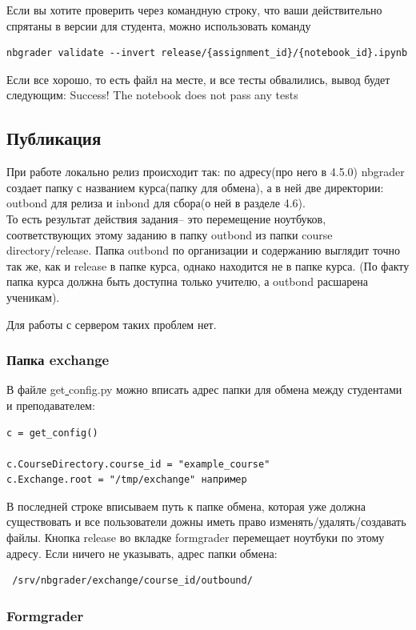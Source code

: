\documentclass[a4paper,12pt]{article}
\begin{document}
Если вы хотите проверить через командную строку, что ваши действительно спрятаны в версии для студента, можно использовать команду
\begin{verbatim}
nbgrader validate --invert release/{assignment_id}/{notebook_id}.ipynb
\end{verbatim}
Если все хорошо, то есть файл на месте, и все тесты обвалились, вывод будет следующим:
\grqq Success! The notebook does not pass any tests\grqq
\subsection{Публикация}

При работе локально релиз происходит так: по адресу(про него в 4.5.0) nbgrader создает папку с названием курса(папку для обмена), а в ней две директории: outbond для релиза и inbond для сбора(о ней в разделе 4.6). \\То есть результат действия  задания\grqq -- это перемещение ноутбуков, соответствующих этому заданию в папку outbond из папки course\underline{ }directory/release.
Папка outbond по организации и содержанию выглядит точно так же, как и release в папке курса, однако находится не в папке курса. (По факту папка курса должна быть доступна только учителю, а outbond расшарена ученикам).

Для работы с сервером таких проблем нет.
\subsubsection{Папка exchange}
В файле get\underline{ }config.py можно вписать адрес папки для обмена между студентами и преподавателем:
\begin{verbatim}
c = get_config()

c.CourseDirectory.course_id = "example_course"
c.Exchange.root = "/tmp/exchange" например
\end{verbatim}
В последней строке вписываем путь к папке обмена, которая уже должна существовать и все пользователи дожны иметь право изменять/удалять/создавать файлы.
Кнопка release во вкладке formgrader перемещает ноутбуки по этому адресу. Если ничего не указывать, адрес папки обмена:
\begin{verbatim} /srv/nbgrader/exchange/course_id/outbound/ \end{verbatim}
\subsubsection{Formgrader}
\end{document}
